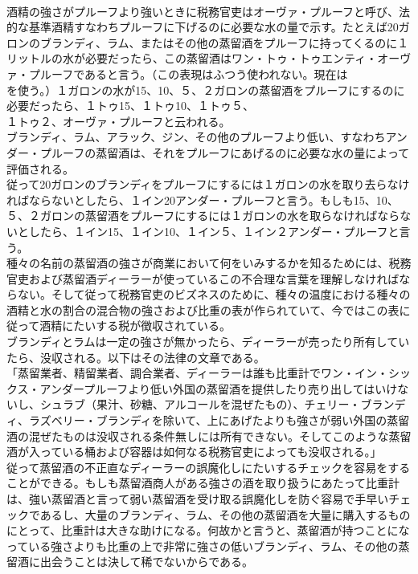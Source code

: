 \documentclass[8pt]{extreport}
\begin{document}
\begin{CJK}{UTF8}{min}
\\	酒精の強さがプルーフより強いときに税務官吏はオーヴァ・プルーフと呼び、法的な基準酒精すなわちプルーフに下げるのに必要な水の量で示す。たとえば20ガロンのブランディ、ラム、またはその他の蒸留酒をプルーフに持ってくるのに１リットルの水が必要だったら、この蒸留酒はワン・トゥ・トゥエンティ・オーヴァ・プルーフであると言う。（この表現はふつう使われない。現在は
\\	を使う。）１ガロンの水が15、10、５、２ガロンの蒸留酒をプルーフにするのに必要だったら、１トゥ15、１トゥ10、１トゥ５、
\\	１トゥ２、オーヴァ・プルーフと云われる。
\\	ブランディ、ラム、アラック、ジン、その他のプルーフより低い、すなわちアンダー・プルーフの蒸留酒は、それをプルーフにあげるのに必要な水の量によって評価される。
\\	従って20ガロンのブランディをプルーフにするには１ガロンの水を取り去らなければならないとしたら、１イン20アンダー・プルーフと言う。もしも15、10、５、２ガロンの蒸留酒をプルーフにするには１ガロンの水を取らなければならないとしたら、１イン15、１イン10、１イン５、１イン２アンダー・プルーフと言う。
\\	種々の名前の蒸留酒の強さが商業において何をいみするかを知るためには、税務官吏および蒸留酒ディーラーが使っているこの不合理な言葉を理解しなければならない。そして従って税務官吏のビズネスのために、種々の温度における種々の酒精と水の割合の混合物の強さおよび比重の表が作られていて、今ではこの表に従って酒精にたいする税が徴収されている。
\\	ブランディとラムは一定の強さが無かったら、ディーラーが売ったり所有していたら、没収される。以下はその法律の文章である。
\\	「蒸留業者、精留業者、調合業者、ディーラーは誰も比重計でワン・イン・シックス・アンダープルーフより低い外国の蒸留酒を提供したり売り出してはいけないし、シュラブ（果汁、砂糖、アルコールを混ぜたもの）、チェリー・ブランディ、ラズベリー・ブランディを除いて、上にあげたよりも強さが弱い外国の蒸留酒の混ぜたものは没収される条件無しには所有できない。そしてこのような蒸留酒が入っている桶および容器は如何なる税務官吏によっても没収される。」
\\	従って蒸留酒の不正直なディーラーの誤魔化しにたいするチェックを容易をすることができる。もしも蒸留酒商人がある強さの酒を取り扱うにあたって比重計は、強い蒸留酒と言って弱い蒸留酒を受け取る誤魔化しを防ぐ容易で手早いチェックであるし、大量のブランディ、ラム、その他の蒸留酒を大量に購入するものにとって、比重計は大きな助けになる。何故かと言うと、蒸留酒が持つことになっている強さよりも比重の上で非常に強さの低いブランディ、ラム、その他の蒸留酒に出会うことは決して稀でないからである。

\end{CJK}
\end{document}
